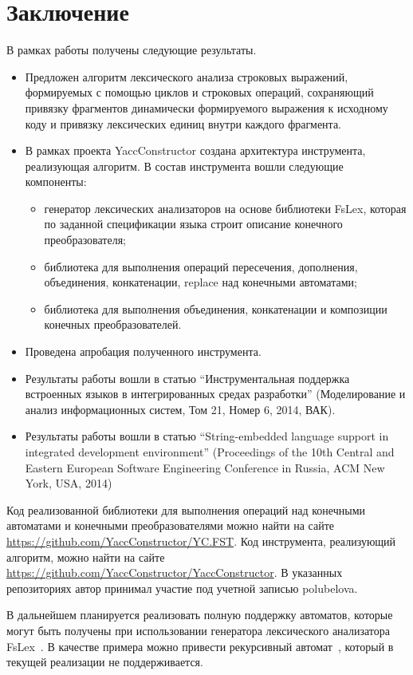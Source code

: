 \section*{Заключение}
В рамках работы получены следующие результаты.

\begin{itemize}
\item Предложен алгоритм лексического анализа строковых выражений, формируемых с помощью циклов и строковых операций, сохраняющий привязку фрагментов динамически формируемого выражения к исходному коду и привязку лексических единиц внутри каждого фрагмента.
\item В рамках проекта YaccConstructor создана архитектура инструмента, реализующая алгоритм. В состав инструмента вошли следующие компоненты: 
\begin{itemize}
\item генератор лексических анализаторов на основе библиотеки FsLex, которая по заданной спецификации языка строит описание конечного преобразователя;
\item библиотека для выполнения операций пересечения, дополнения, объединения, конкатенации, replace над конечными автоматами;
\item библиотека для выполнения объединения, конкатенации и композиции конечных преобразователей.
\end{itemize}
\item Проведена апробация полученного инструмента.
\item Результаты работы вошли в статью ``Инструментальная поддержка встроенных языков в
интегрированных средах разработки'' (Моделирование и анализ информационных систем, Том 21, Номер 6, 2014, ВАК).
\item Результаты работы вошли в статью ``String-embedded language support in integrated development environment'' (Proceedings of the 10th Central and Eastern European Software Engineering Conference in Russia, ACM New York, USA, 2014)
\end{itemize}

Код реализованной библиотеки для выполнения операций над конечными автоматами и конечными преобразователями можно найти на сайте \url{https://github.com/YaccConstructor/YC.FST}. Код инструмента, реализующий алгоритм, можно найти на сайте \url{https://github.com/YaccConstructor/YaccConstructor}. В указанных репозиториях автор принимал участие под учетной записью polubelova.


В дальнейшем планируется реализовать полную поддержку автоматов, которые могут быть получены при использовании генератора лексического анализатора FsLex~\cite{FsLex}. В качестве примера можно привести рекурсивный автомат~\cite{Tellier06learningrecursive}, который в текущей реализации не поддерживается. 

